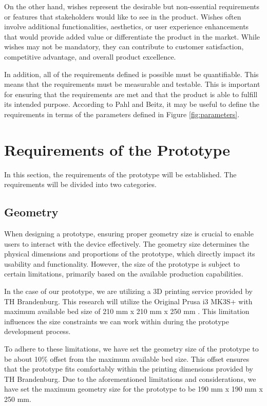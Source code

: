 On the other hand, wishes represent the desirable but non-essential requirements or features that stakeholders would like to see in the product. Wishes often involve additional functionalities, aesthetics, or user experience enhancements that would provide added value or differentiate the product in the market. While wishes may not be mandatory, they can contribute to customer satisfaction, competitive advantage, and overall product excellence.

In addition, all of the requirements defined is possible must be quantifiable. This means that the requirements must be measurable and testable. This is important for ensuring that the requirements are met and that the product is able to fulfill its intended purpose. According to Pahl and Beitz, it may be useful to define the requirements in terms of the parameters defined in Figure \ref{fig:parameters}.


\section{Requirements of the Prototype}
In this section, the requirements of the prototype will be established. The requirements will be divided into two categories.

\subsection{Geometry}
When designing a prototype, ensuring proper geometry size is crucial to enable users to interact with the device effectively. The geometry size determines the physical dimensions and proportions of the prototype, which directly impact its usability and functionality. However, the size of the prototype is subject to certain limitations, primarily based on the available production capabilities.

In the case of our prototype, we are utilizing a 3D printing service provided by TH Brandenburg. This research will utilize the Original Prusa i3 MK3S+ with maximum available bed size of 210 mm x 210 mm x 250 mm \cite{Prusa}. This limitation influences the size constraints we can work within during the prototype development process.

To adhere to these limitations, we have set the geometry size of the prototype to be about 10\% offset from the maximum available bed size. This offset ensures that the prototype fits comfortably within the printing dimensions provided by TH Brandenburg. Due to the aforementioned limitations and considerations, we have set the maximum geometry size for the prototype to be 190 mm x 190 mm x 250 mm.

